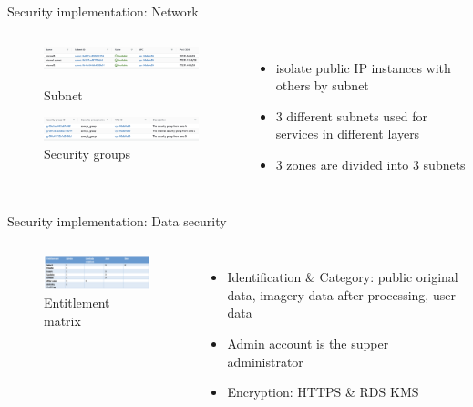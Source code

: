 \documentclass[aspectratio=169]{beamer}
\begin{document}
\begin{frame}[fragile]{Security implementation: Network}

  \begin{columns} 
      \begin{figure}[htbp]
        
        \centerline{\includegraphics[width=200pt]{images/subnet.png}}
        \caption{Subnet}

        \centerline{\includegraphics[width=200pt]{images/security.png}}
        \caption{Security groups}

      \end{figure}
      \begin{itemize}
        \item isolate public IP instances with others by subnet
        \pause
        \item 3 different subnets used for services in different layers
        \pause
        \item 3 zones are divided into 3 subnets
      \end{itemize}
  \end{columns}

\end{frame}


\begin{frame}[fragile]{Security implementation: Data security}

  \begin{columns}
      \begin{figure}[htbp]
        \centerline{\includegraphics[width=180pt]{images/matrix.png}}
        \caption{Entitlement matrix}
      \end{figure}
      \begin{itemize}
        \item Identification \& Category: public original data, imagery data after processing, user data
        \pause
        \item Admin account is the supper administrator
        \pause
        \item Encryption: HTTPS \& RDS KMS 
      \end{itemize}
  \end{columns}

\end{frame}
\end{document}
